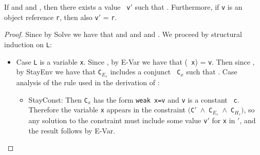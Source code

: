 \begin{Lemma}
\label{lem:aux}
If \emph{} and
 \emph{}  and
\emph{}, then there exists a value {\tt
  v$'$} such that
  \emph{}.  Furthermore, if {\tt v}
  is an object reference {\tt r}, then also {\tt v$'$} = {\tt r}.
\end{Lemma}
\begin{proof}
Since  by
{\sc Solve} we have that 
     and
     and
     and
    .
 We proceed by structural induction on {\tt L}:
\begin{itemize}
\item Case {\tt L} is a variable {\tt x}.  Since
  , by {\sc E-Var} we have that \Euid({\tt
    x}) = {\tt v}.  Then since , by
  {\sc StayEnv} we have that {\tt C$_{E_s}$} includes a conjunct {\tt
    C$_x$} such that .  Case analysis of
  the rule used in the derivation of :
\begin{itemize}
 \item {\sc StayConst}:  Then 
{\tt C$_x$} has the form {\tt weak x=v} and {\tt v} is a constant {\tt
  c}.
  Therefore the variable {\tt x} appears in the constraint  {\tt $($C$'$ $\wedge$ C$_{E_s}$ $\wedge$
      C$_{H_s}$$)$}, so any solution to the constraint must include some value {\tt v$'$} for {\tt x} in
    {\tt \Euid$'$}, and the result follows by {\sc E-Var}.


\end{itemize}
\end{itemize}
\end{proof}

